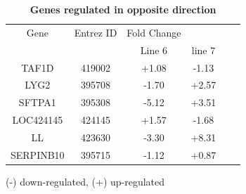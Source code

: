 \documentclass[10pt]{article}
\begin{document}
\begin{table}[!ht]
\caption{
\bf{Genes regulated in opposite direction}}
\begin{tabular}{cccccc}
\hline
Gene & Entrez ID & Fold Change & \\
 & & Line 6 & line 7 \\
\hline
TAF1D & 419002 & +1.08 & -1.13 \\
LYG2 & 395708 & -1.70 & +2.57 \\
SFTPA1 & 395308 & -5.12 & +3.51 \\
LOC424145 & 424145 & +1.57 & -1.68 \\
LL & 423630 & -3.30 & +8.31 \\
SERPINB10 & 395715 & -1.12 & +0.87 \\
\hline
\end{tabular}
\begin{flushleft}
    (-) down-regulated, (+) up-regulated
\end{flushleft}
\label{tab:opposite}
\end{table}
\end{document}
